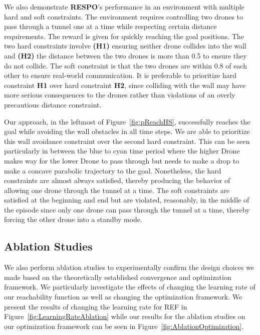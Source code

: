 \documentclass{article}
\theoremstyle{definition}
\begin{document}
We also demonstrate \textbf{RESPO}'s performance in an environment with multiple hard and soft constraints. The environment requires controlling two drones to pass through a tunnel one at a time while respecting certain distance requirements. The reward is given for quickly reaching the goal positions. The two hard constraints involve \textbf{(H1)} ensuring neither drone collides into the wall and \textbf{(H2)} the distance between the two drones is more than 0.5 to ensure they do not collide. The soft constraint is that the two drones are within 0.8 of each other to ensure real-world communication. It is preferable to prioritize hard constraint \textbf{H1} over hard constraint \textbf{H2}, since colliding with the wall may have more serious consequences to the drones rather than violations of an overly precautious distance constraint.

Our approach, in the leftmost of Figure~\ref{fig:pReachHS}, successfully reaches the goal while avoiding the wall obstacles in all time steps. We are able to prioritize this wall avoidance constraint over the second hard constraint. This can be seen particularly in between the blue to cyan time period where the higher Drone makes way for the lower Drone to pass through but needs to make a drop to make a concave parabolic trajectory to the goal. Nonetheless, the hard constraints are almost always satisfied, thereby producing the behavior of allowing one drone through the tunnel at a time. The soft constraints are satisfied at the beginning and end but are violated, reasonably, in the middle of the episode since only one drone can pass through the tunnel at a time, thereby forcing the other drone into a standby mode.

\subsection{Ablation Studies}
We also perform ablation studies to experimentally confirm the design choices we made based on the theoretically established convergence and optimization framework. We particularly investigate the effects of changing the learning rate of our reachability function as well as changing the optimization framework. We present the results of changing the learning rate for REF in Figure~\ref{fig:LearningRateAblation} while our results for the ablation studies on our optimization framework can be seen in Figure~\ref{fig:AblationOptimization}. 
\end{document}
